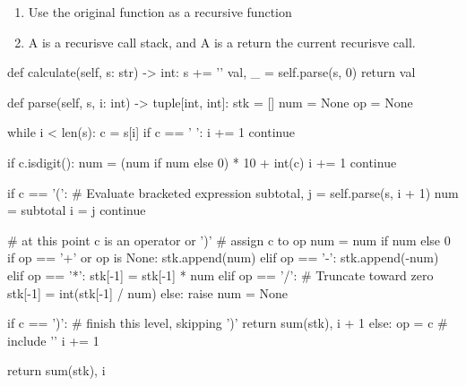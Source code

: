 \begin{enumerate}
\item Use the original function as a recursive function
\item A  is a recurisve call stack, and A  is a return the current recurisve call. 
\end{enumerate}
\begin{python}
def calculate(self, s: str) -> int:
    s += '\0'
    val, _ = self.parse(s, 0)
    return val

def parse(self, s, i: int) -> tuple[int, int]:
    stk = []
    num = None
    op = None

    while i < len(s):
        c = s[i]
        if c == ' ':
            i += 1
            continue

        if c.isdigit():
            num = (num if num else 0) * 10 + int(c)
            i += 1
            continue

        if c == '(':
            # Evaluate bracketed expression
            subtotal, j = self.parse(s, i + 1)
            num = subtotal
            i = j
            continue

        # at this point c is an operator or ')'
        # assign c to op
        num = num if num else 0
        if op == '+' or op is None:
            stk.append(num)
        elif op == '-':
            stk.append(-num)
        elif op == '*':
            stk[-1] = stk[-1] * num
        elif op == '/':
            # Truncate toward zero
            stk[-1] = int(stk[-1] / num)
        else:
            raise
        num = None
            
        if c == ')':
            # finish this level, skipping ')'
            return sum(stk), i + 1
        else:
            op = c  # include '\0'
            i += 1

    return sum(stk), i
\end{python}

